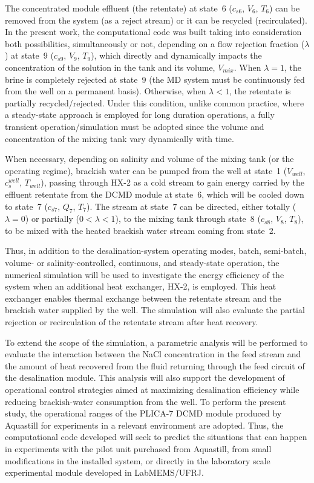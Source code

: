 \documentclass[14pt,letterpaper,fleqn]{extarticle}
\begin{document}
The concentrated module effluent (the retentate) at state~6 ($c_{s6}$, $V_6$, $T_6$)
can be removed from the system (as a reject stream) or it can be recycled (recirculated).
In the present work, the computational code was built taking into consideration both
possibilities, simultaneously or not, depending on a flow rejection fraction ($\lambda$)
at state~9 ($c_{s9}$, $V_9$, $T_9$), which directly and dynamically impacts the
concentration of the solution in the tank and its volume, $V_{mix}$. When $\lambda = 1$,
the brine is completely rejected at state~9 (the MD system must be continuously fed from
the well on a permanent basis). Otherwise, when $\lambda < 1$, the retentate is partially
recycled/rejected. Under this condition, unlike common practice, where a steady-state
approach is employed for long duration operations, a fully transient operation/simulation
must be adopted since the volume and concentration of the mixing tank vary dynamically
with time.

When necessary, depending on salinity and volume of the mixing tank (or the operating
regime), brackish water can be pumped from the well at state~1 ($V_{well}$, $c_s^{well}$,
$T_{well}$), passing through HX-2 as a cold stream to gain energy carried by the effluent
retentate from the DCMD module at state~6, which will be cooled down to state~7 ($c_{s7}$,
$Q_7$, $T_7$). The stream at state~7 can be directed, either totally ($\lambda = 0$) or
partially ($0 < \lambda < 1$), to the mixing tank through state~8 ($c_{s8}$, $V_8$, $T_8$),
to be mixed with the heated brackish water stream coming from state~2.

Thus, in addition to the desalination-system operating modes, batch,
semi-batch, volume- or salinity-controlled, continuous, and steady-state
operation, the numerical simulation will be used to investigate the energy
efficiency of the system when an additional heat exchanger, HX-2, is employed.
This heat exchanger enables thermal exchange between the retentate stream and
the brackish water supplied by the well. The simulation will also evaluate the
partial rejection or recirculation of the retentate stream after heat recovery.

To extend the scope of the simulation, a parametric analysis will be performed
to evaluate the interaction between the NaCl concentration in the feed stream
and the amount of heat recovered from the fluid returning through the feed
circuit of the desalination module. This analysis will also support the
development of operational control strategies aimed at maximizing desalination
efficiency while reducing brackish-water consumption from the well. To perform the present study, 
the operational ranges of the PLICA-7 DCMD module produced by Aquastill for experiments in a relevant 
environment are adopted. Thus, the computational code developed will seek to predict the situations
that can happen in experiments with the pilot unit purchased from Aquastill, from small
modifications in the installed system, or directly in the laboratory scale experimental
module developed in LabMEMS/UFRJ.
\end{document}
